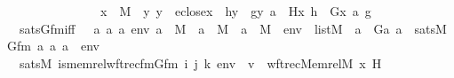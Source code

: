 \begin{isabellebody}
\ \ \ \ \ \ \ \ \ \ \ \ \ \ \ {\isasymLongrightarrow}\ x\ {\isasymin}\ M\ {\isasymLongrightarrow}\ {\isacharparenleft}{\kern0pt}{\isasymAnd}y{\isachardot}{\kern0pt}\ y\ {\isasymin}\ eclose{\isacharparenleft}{\kern0pt}x{\isacharparenright}{\kern0pt}\ {\isasymLongrightarrow}\ h{\isacharbackquote}{\kern0pt}y\ {\isacharequal}{\kern0pt}\ g{\isacharbackquote}{\kern0pt}{\isacharless}{\kern0pt}y{\isacharcomma}{\kern0pt}\ a{\isachargreater}{\kern0pt}{\isacharparenright}{\kern0pt}\ {\isasymLongrightarrow}\ H{\isacharparenleft}{\kern0pt}x{\isacharcomma}{\kern0pt}\ h{\isacharparenright}{\kern0pt}\ {\isacharequal}{\kern0pt}\ G{\isacharparenleft}{\kern0pt}{\isacharless}{\kern0pt}x{\isacharcomma}{\kern0pt}\ a{\isachargreater}{\kern0pt}{\isacharcomma}{\kern0pt}\ g{\isacharparenright}{\kern0pt}{\isachardoublequoteclose}\ \ \isanewline
\ \ \ sats{\isacharunderscore}{\kern0pt}Gfm{\isacharunderscore}{\kern0pt}iff\ {\isacharcolon}{\kern0pt}\ {\isachardoublequoteopen}\ {\isacharparenleft}{\kern0pt}{\isasymAnd}a{}\ a{}\ a{}\ env{\isachardot}{\kern0pt}\ a{}\ {\isasymin}\ M\ {\isasymLongrightarrow}\ a{}\ {\isasymin}\ M\ {\isasymLongrightarrow}\ a{}\ {\isasymin}\ M\ {\isasymLongrightarrow}\ env\ {\isasymin}\ list{\isacharparenleft}{\kern0pt}M{\isacharparenright}{\kern0pt}\ {\isasymLongrightarrow}\ a{}\ {\isacharequal}{\kern0pt}\ G{\isacharparenleft}{\kern0pt}a{}{\isacharcomma}{\kern0pt}\ a{}{\isacharparenright}{\kern0pt}\ {\isasymlongleftrightarrow}\ sats{\isacharparenleft}{\kern0pt}M{\isacharcomma}{\kern0pt}\ Gfm{\isacharcomma}{\kern0pt}\ {\isacharbrackleft}{\kern0pt}a{}{\isacharcomma}{\kern0pt}\ a{}{\isacharcomma}{\kern0pt}\ a{}{\isacharbrackright}{\kern0pt}\ {\isacharat}{\kern0pt}\ env{\isacharparenright}{\kern0pt}{\isacharparenright}{\kern0pt}{\isachardoublequoteclose}\ \ \isanewline
\ \ \ \ \ \ \ \ \ \ \isanewline
\ \ \ {\isachardoublequoteopen}sats{\isacharparenleft}{\kern0pt}M{\isacharcomma}{\kern0pt}\ is{\isacharunderscore}{\kern0pt}memrel{\isacharunderscore}{\kern0pt}wftrec{\isacharunderscore}{\kern0pt}fm{\isacharparenleft}{\kern0pt}Gfm{\isacharcomma}{\kern0pt}\ i{\isacharcomma}{\kern0pt}\ j{\isacharcomma}{\kern0pt}\ k{\isacharparenright}{\kern0pt}{\isacharcomma}{\kern0pt}\ env{\isacharparenright}{\kern0pt}\ {\isasymlongleftrightarrow}\ v\ {\isacharequal}{\kern0pt}\ wftrec{\isacharparenleft}{\kern0pt}Memrel{\isacharparenleft}{\kern0pt}M{\isacharparenright}{\kern0pt}{\isacharcircum}{\kern0pt}{\isacharplus}{\kern0pt}{\isacharcomma}{\kern0pt}\ x{\isacharcomma}{\kern0pt}\ H{\isacharparenright}{\kern0pt}{\isachardoublequoteclose}\ \isanewline

\end{isabellebody}

